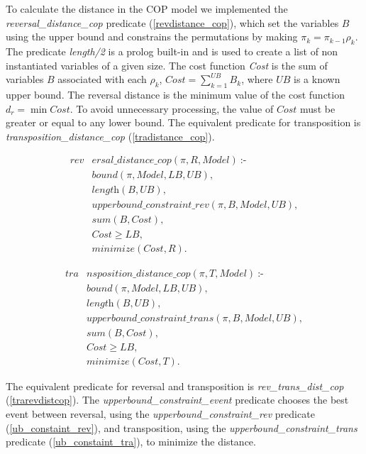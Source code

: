 To calculate the distance in the COP model we implemented the
\textit{reversal\_distance\_cop} predicate (\ref{revdistance_cop}),
which set the variables $B$ using the upper bound and constrains the
permutations by making $\pi_{k} = \pi_{k-1} \rho_{k}$. The predicate
\textit{length/2} is a prolog built-in and is used to create a list of
non instantiated variables of a given size. The cost function
\textit{Cost} is the sum of variables $B$ associated with each
$\rho_{k}$, $Cost = \sum_{k=1}^{UB} B_{k}$, where $UB$ is a known
upper bound. The reversal distance is the minimum value of the cost
function $d_{r} = \min Cost$. To avoid unnecessary processing, the
value of $Cost$ must be greater or equal to any lower bound. The
equivalent predicate for transposition is
\textit{transposition\_distance\_cop} (\ref{tradistance_cop}).

\begin{align}
  \label{revdistance_cop}
  \textit{rev}&\textit{ersal\_distance\_cop}(\pi, R, Model)~\text{:-} \nonumber\\
  &\textit{bound}(\pi, Model, LB, UB), \nonumber\\
  &\textit{length}(B, UB), \nonumber \\
  &\textit{upperbound\_constraint\_rev}(\pi, B, Model, UB), \\
  &\textit{sum}(B, Cost), \nonumber \\
  &\textit{Cost} \ge \textit{LB}, \nonumber \\
  &\textit{minimize}(Cost, R). \nonumber
\end{align}

\begin{align}
  \label{tradistance_cop}
  \textit{tra}&\textit{nsposition\_distance\_cop}(\pi, T, Model)~\text{:-} \nonumber\\
  &\textit{bound}(\pi, Model, LB, UB), \nonumber\\
  &\textit{length}(B, UB), \nonumber \\
  &\textit{upperbound\_constraint\_trans}(\pi, B, Model, UB), \\
  &\textit{sum}(B, Cost), \nonumber \\
  &\textit{Cost} \ge \textit{LB}, \nonumber \\
  &\textit{minimize}(Cost, T). \nonumber
\end{align}

The equivalent predicate for reversal and transposition is
\textit{rev\_trans\_dist\_cop} (\ref{trarevdistcop}). The
\textit{upperbound\_constraint\_event} predicate chooses the best
event between reversal, using the \textit{upperbound\_constraint\_rev}
predicate (\ref{ub_constaint_rev}), and transposition, using the
\textit{upperbound\_constraint\_trans} predicate
(\ref{ub_constaint_tra}), to minimize the distance.

